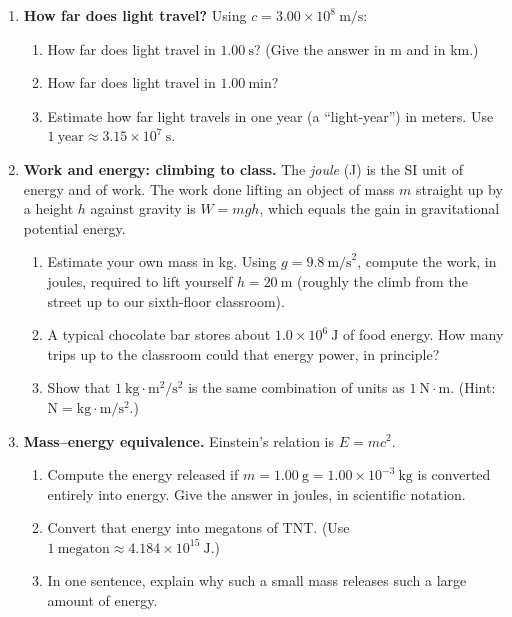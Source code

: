 \documentclass[12pt, twoside]{article}
\begin{document}
\begin{enumerate}[itemsep=0.5cm]
\item \textbf{How far does light travel?} Using $c = 3.00\times10^{8}~\text{m/s}$:
  \begin{enumerate}[itemsep=2cm]
    \item How far does light travel in $1.00~\text{s}$? (Give the answer in m and in km.)
    \item How far does light travel in $1.00~\text{min}$?
    \item Estimate how far light travels in one year (a ``light-year'') in meters. Use $1~\text{year} \approx 3.15\times10^{7}~\text{s}$.
  \end{enumerate}

\newpage
\item \textbf{Work and energy: climbing to class.} The \emph{joule} (J) is the SI unit of energy and of work. The work done lifting an object of mass $m$ straight up by a height $h$ against gravity is
$W = mgh$, which equals the gain in gravitational potential energy.

  \begin{enumerate}[itemsep=1.8cm]
    \item Estimate your own mass in kg. Using $g = 9.8~\text{m/s}^{2}$, compute the work, in joules, required to lift yourself $h = 20~\text{m}$ (roughly the climb from the street up to our sixth-floor classroom).
    \item A typical chocolate bar stores about $1.0\times10^{6}~\text{J}$ of food energy. How many trips up to the classroom could that energy power, in principle?
    \item Show that $1~\text{kg}\cdot\text{m}^{2}/\text{s}^{2}$ is the same combination of units as $1~\text{N}\cdot\text{m}$. (Hint: $\text{N} = \text{kg}\cdot\text{m}/\text{s}^{2}$.)
  \end{enumerate}
  \vspace{0.3cm}

\item \textbf{Mass--energy equivalence.} Einstein's relation is $E = mc^{2}$.
  \begin{enumerate}[itemsep=1.8cm]
    \item Compute the energy released if $m = 1.00~\text{g} = 1.00\times10^{-3}~\text{kg}$ is converted entirely into energy. Give the answer in joules, in scientific notation.
    \item Convert that energy into megatons of TNT. (Use $1~\text{megaton} \approx 4.184\times10^{15}~\text{J}$.)
    \item In one sentence, explain why such a small mass releases such a large amount of energy.
  \end{enumerate}


\end{enumerate}
\end{document}
